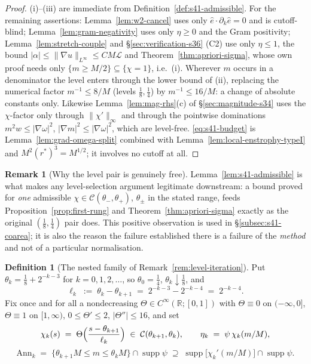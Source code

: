 \documentclass[11pt]{article}
\theoremstyle{definition}
\newtheorem{definition}[theorem]{Definition}
\newtheorem{remark}[theorem]{Remark}
\theoremstyle{remark}
\newcommand{\R}{\mathbb{R}}
\begin{document}
\begin{proof}
  (i)--(iii) are immediate from Definition~\ref{def:s41-admissible}. For the
  remaining assertions: Lemma~\ref{lem:w2-cancel} uses only
  $\hat{e}\cdot\partial_k\hat{e}=0$ and is cutoff-blind;
  Lemma~\ref{lem:gram-negativity} uses only $\eta\geq0$ and the Gram
  positivity; Lemma~\ref{lem:stretch-couple} and \S\ref{sec:verification-s36}
  (C2) use only $\eta\leq1$, the bound
  $|\alpha|\leq\|\nabla u\|_{L^\infty}\leq CM\mathcal{L}$ and
  Theorem~\ref{thm:apriori-sigma}, whose own proof needs only
  $\{m\geq M/2\}\subseteq\{\chi=1\}$, i.e.~(i). Wherever $m$ occurs in a
  denominator the level enters through the lower bound of (ii), replacing
  the numerical factor $m^{-1}\leq 8/M$ (levels $\tfrac18,\tfrac14$) by
  $m^{-1}\leq16/M$: a change of absolute constants only. Likewise
  Lemma~\ref{lem:mag-rhs}(c) of \S\ref{sec:magnitude-s34} uses the
  $\chi$-factor only through $\|\chi'\|_\infty$ and through the pointwise
  dominations $m^2w\leq|\nabla\omega|^2$, $|\nabla m|^2\leq|\nabla\omega|^2$,
  which are level-free.
  \eqref{eq:s41-budget} is Lemma~\ref{lem:grad-omega-split} combined with
  Lemma~\ref{lem:local-enstrophy-typeI} and $M^2(r^*)^3=M^{1/2}$; it
  involves no cutoff at all.
\end{proof}

\begin{remark}[Why the level pair is genuinely free]\label{rem:s41-free}
  Lemma~\ref{lem:s41-admissible} is what makes any level-selection argument
  legitimate downstream: a bound proved for \emph{one} admissible
  $\chi\in\mathcal{C}(\theta_-,\theta_+)$, $\theta_\pm$ in the stated range,
  feeds Proposition~\ref{prop:first-rung} and
  Theorem~\ref{thm:apriori-sigma} exactly as the original
  $(\tfrac18,\tfrac14)$ pair does. This positive observation is used in
  \S\ref{subsec:s41-coarea}; it is also the reason the failure established
  there is a failure of the \emph{method} and not of a particular
  normalisation.
\end{remark}

\begin{definition}[The nested family of Remark~\ref{rem:level-iteration}]
  \label{def:s41-nested}
  Put $\theta_k=\tfrac18+2^{-k-3}$ for $k=0,1,2,\dots$, so $\theta_0=\tfrac14$,
  $\theta_k\downarrow\tfrac18$, and
  \[
    \ell_k \;:=\; \theta_k-\theta_{k+1} \;=\; 2^{-k-3}-2^{-k-4}\;=\;2^{-k-4}.
  \]
  Fix once and for all a nondecreasing $\Theta\in C^\infty(\R;[0,1])$ with
  $\Theta\equiv0$ on $(-\infty,0]$, $\Theta\equiv1$ on $[1,\infty)$,
  $0\leq\Theta'\leq2$, $|\Theta''|\leq16$, and set
  \[
    \chi_k(s)\;=\;\Theta\Bigl(\frac{s-\theta_{k+1}}{\ell_k}\Bigr)
      \;\in\;\mathcal{C}(\theta_{k+1},\theta_k),
    \qquad
    \eta_k \;=\; \psi\,\chi_k(m/M),
  \]
  \[
    \mathrm{Ann}_k \;=\; \{\theta_{k+1}M\leq m\leq\theta_kM\}
      \cap\operatorname{supp}\psi \;\supseteq\;
      \operatorname{supp}\bigl[\chi_k'(m/M)\bigr]\cap\operatorname{supp}\psi .
  \]
\end{definition}
\end{document}

